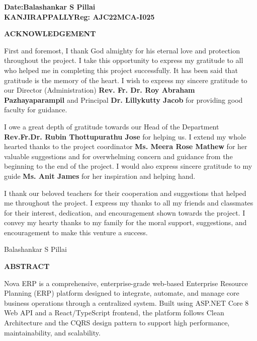 \documentclass[12pt,a4paper]{report}
\newcommand{\student}{Balashankar S Pillai}
\newcommand{\regno}{AJC22MCA-I025}
\newcommand{\guide}{Ms. Anit James}
\newcommand{\coordinator}{Ms. Meera Rose Mathew}
\begin{document}
\vspace{40pt}
\noindent\textbf{Date:}\hfill\textbf{\student}\\[6pt]
\textbf{KANJIRAPPALLY}\hfill\textbf{Reg: \regno}
\clearpage

\thispagestyle{empty}
\begin{center}{\bfseries\large ACKNOWLEDGEMENT\par}\end{center}
\noindent First and foremost, I thank God almighty for his eternal love and protection throughout the project. I take this opportunity to express my gratitude to all who helped me in completing this project successfully. It has been said that gratitude is the memory of the heart. I wish to express my sincere gratitude to our Director (Administration) \textbf{Rev. Fr. Dr. Roy Abraham Pazhayaparampil} and Principal \textbf{Dr. Lillykutty Jacob} for providing good faculty for guidance.

I owe a great depth of gratitude towards our Head of the Department \textbf{Rev.Fr.Dr. Rubin Thottupurathu Jose} for helping us. I extend my whole hearted thanks to the project coordinator \textbf{\coordinator} for her valuable suggestions and for overwhelming concern and guidance from the beginning to the end of the project. I would also express sincere gratitude to my guide \textbf{\guide} for her inspiration and helping hand.

I thank our beloved teachers for their cooperation and suggestions that helped me throughout the project. I express my thanks to all my friends and classmates for their interest, dedication, and encouragement shown towards the project. I convey my hearty thanks to my family for the moral support, suggestions, and encouragement to make this venture a success.

\vspace{20pt}
\hfill\student
\clearpage

\thispagestyle{empty}
\begin{center}{\bfseries\large ABSTRACT\par}\end{center}
\noindent Nova ERP is a comprehensive, enterprise-grade web-based Enterprise Resource Planning (ERP) platform designed to integrate, automate, and manage core business operations through a centralized system. Built using ASP.NET Core 8 Web API and a React/TypeScript frontend, the platform follows Clean Architecture and the CQRS design pattern to support high performance, maintainability, and scalability.
\end{document}
